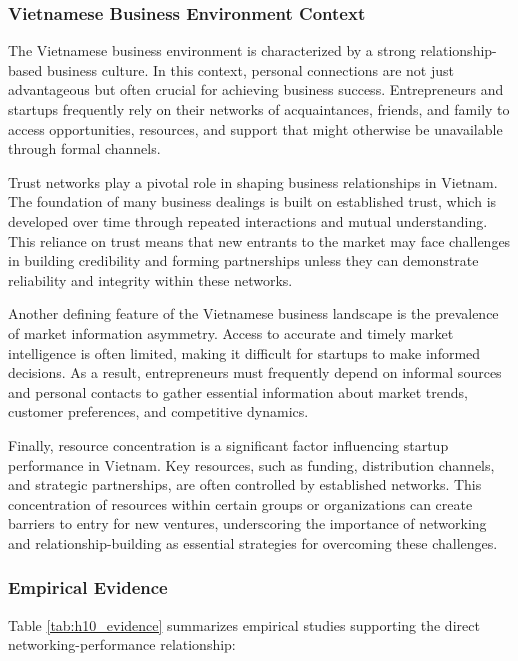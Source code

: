 \documentclass[../Main.tex]{subfiles}
\begin{document}
    \subsubsection{Vietnamese Business Environment Context}
    The Vietnamese business environment is characterized by a strong relationship-based business culture. In this context, personal connections are not just advantageous but often crucial for achieving business success. Entrepreneurs and startups frequently rely on their networks of acquaintances, friends, and family to access opportunities, resources, and support that might otherwise be unavailable through formal channels.

    Trust networks play a pivotal role in shaping business relationships in Vietnam. The foundation of many business dealings is built on established trust, which is developed over time through repeated interactions and mutual understanding. This reliance on trust means that new entrants to the market may face challenges in building credibility and forming partnerships unless they can demonstrate reliability and integrity within these networks.

    Another defining feature of the Vietnamese business landscape is the prevalence of market information asymmetry. Access to accurate and timely market intelligence is often limited, making it difficult for startups to make informed decisions. As a result, entrepreneurs must frequently depend on informal sources and personal contacts to gather essential information about market trends, customer preferences, and competitive dynamics.

    Finally, resource concentration is a significant factor influencing startup performance in Vietnam. Key resources, such as funding, distribution channels, and strategic partnerships, are often controlled by established networks. This concentration of resources within certain groups or organizations can create barriers to entry for new ventures, underscoring the importance of networking and relationship-building as essential strategies for overcoming these challenges.

    \subsubsection{Empirical Evidence}
    Table \ref{tab:h10_evidence} summarizes empirical studies supporting the direct networking-performance relationship:
\end{document}
